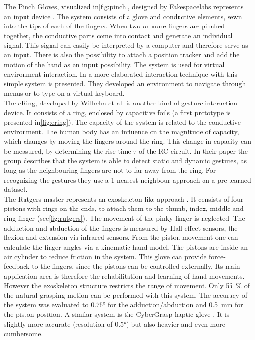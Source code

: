 The Pinch Gloves, visualized in\ref{fig:pinch}, designed by Fakespacelabs represents an input device \cite{bowman2001using}. The system consists of a glove and conductive elements, sewn into the tips of each of the fingers. When two or more fingers are pinched together, the conductive parts come into contact and generate an individual signal. This signal can easily be interpreted by a computer and therefore serve as an input. There is also the possibility to attach a position tracker and add the motion of the hand as an input possibility. The system is used for virtual environment interaction. In \cite{bowman2001using} a more elaborated interaction technique with this simple system is presented. They developed an environment to navigate through menus or to type on a virtual keyboard.\\
The eRing, developed by Wilhelm et al. is another kind of gesture interaction device. It consists of a ring, enclosed by capacitive foils (a first prototype is presented in\ref{fig:ering}). The capacity of the system is related to the conductive environment. The human body has an influence on the magnitude of capacity, which changes by moving the fingers around the ring. This change in capacity can be measured, by determining the rise time $ \tau $ of the RC circuit. In their paper the group describes that the system is able to detect static and dynamic gestures, as long as the neighbouring fingers are not to far away from the ring. For recognizing the gestures they use a 1-nearest neighbour approach on a pre learned dataset.\\
The Rutgers master  represents an exoskeleton like approach \cite{bouzit2002rutgers}. It consists of four pistons with rings on the ends, to attach them to the thumb, index, middle and ring finger (see\ref{fig:rutgers}). The movement of the pinky finger is neglected. The adduction and abduction of the fingers is measured by Hall-effect sensors, the flexion and extension via infrared sensors. From the piston movement one can calculate the finger angles via a kinematic hand model. The pistons are inside an air cylinder to reduce friction in the system. This glove can provide force-feedback to the fingers, since the pistons can be controlled externally. Its main application area is therefore the rehabilitation and learning of hand movements. However the exoskeleton structure restricts the range of movement. Only \SI{55}{\percent} of the natural grasping motion can be performed with this system. The accuracy of the system was evaluated to $ \ang{0.75} $ for the adduction/abduction and \SI{0.5}{mm} for the piston position. A similar system is the CyberGrasp haptic glove \cite{cyberglove}. It is slightly more accurate (resolution of \ang{0.5}) but also heavier and even more cumbersome.\\
